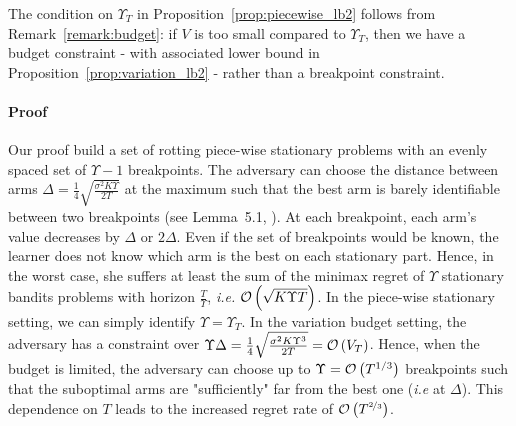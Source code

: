 The condition on $\Upsilon_T$ in Proposition~\ref{prop:piecewise_lb2} follows from Remark~\ref{remark:budget}: if $V$ is too small compared to $\Upsilon_T$, then we have a budget constraint - with associated lower bound in Proposition~\ref{prop:variation_lb2} - rather than a breakpoint constraint.


\paragraph{Proof}
 Our proof build a set of rotting piece-wise stationary problems with an evenly spaced set of $\Upsilon -1$ breakpoints. The adversary can choose the distance between arms $\Delta=\frac{1}{4} \sqrt{\frac{\sigma^{2} K \Upsilon}{2 T}}$ at the maximum such that the best arm is barely identifiable between two breakpoints (see Lemma~5.1, \citet{auer2002nonstochastic}). At each breakpoint, each arm's value decreases by $\Delta$ or $2\Delta$. Even if the set of breakpoints would be known, the learner does not know which arm is the best on each stationary part. Hence, in the worst case, she suffers at least the sum of the minimax regret of $\Upsilon$ stationary bandits problems with horizon $\frac{T}{\Upsilon}$, \textit{i.e.}  $\mathcal{O} \left(\sqrt{K\Upsilon T}\right)$. In the piece-wise stationary setting, we can simply identify $\Upsilon = \Upsilon_T$. In the variation budget setting, the adversary has a constraint over $\Upsilon \Delta = \frac{1}{4} \sqrt{\frac{\sigma^{2} K \Upsilon^3}{2 T}}=  \mathcal{O}\left(V_T\right)$. Hence, when the budget is limited, the adversary can choose up to $\Upsilon = \mathcal{O}\left( T^{1/3}\right)$ breakpoints such that the suboptimal arms are "sufficiently" far from the best one (\textit{i.e} at $\Delta$). This dependence on $T$ leads to the increased regret rate of $\mathcal{O}\left(T^{\nicefrac{2}{3}}\right)$.
 
